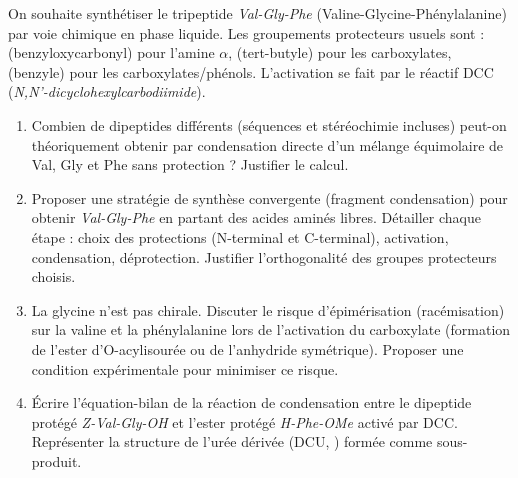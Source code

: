 \documentclass[11pt]{article}
\begin{document}
\begin{exercice}
On souhaite synthétiser le tripeptide \textit{Val-Gly-Phe} (Valine-Glycine-Phénylalanine) par voie chimique en phase liquide. Les groupements protecteurs usuels sont :  (benzyloxycarbonyl) pour l'amine $\alpha$,  (tert-butyle) pour les carboxylates,  (benzyle) pour les carboxylates/phénols. L'activation se fait par le réactif DCC (\textit{N,N'-dicyclohexylcarbodiimide}).
\begin{enumerate}
    \item Combien de dipeptides différents (séquences et stéréochimie incluses) peut-on théoriquement obtenir par condensation directe d'un mélange équimolaire de Val, Gly et Phe sans protection ? Justifier le calcul.
    \item Proposer une stratégie de synthèse convergente (fragment condensation) pour obtenir \textit{Val-Gly-Phe} en partant des acides aminés libres. Détailler chaque étape : choix des protections (N-terminal et C-terminal), activation, condensation, déprotection. Justifier l'orthogonalité des groupes protecteurs choisis.
    \item La glycine n'est pas chirale. Discuter le risque d'épimérisation (racémisation) sur la valine et la phénylalanine lors de l'activation du carboxylate (formation de l'ester d'O-acylisourée ou de l'anhydride symétrique). Proposer une condition expérimentale pour minimiser ce risque.
    \item Écrire l'équation-bilan de la réaction de condensation entre le dipeptide protégé \textit{Z-Val-Gly-OH} et l'ester protégé \textit{H-Phe-OMe} activé par DCC. Représenter la structure de l'urée dérivée (DCU, ) formée comme sous-produit.
\end{enumerate}
\end{exercice}
\end{document}

